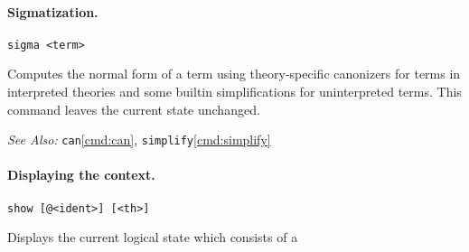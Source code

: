 \documentclass[12pt]{article}
\begin{document}
\paragraph{Sigmatization.}\label{cmd:sigma}
  \begin{center}
  \texttt{sigma <term>}
  \end{center}
Computes the normal form of a term using theory-specific canonizers for 
terms in interpreted theories and some  builtin simplifications 
for uninterpreted terms. This command leaves the current state unchanged.

\noindent
{\em See Also:}  
\texttt{can}\ref{cmd:can},
\texttt{simplify}\ref{cmd:simplify}


\paragraph{Displaying the context.}\label{cmd:show}
  \begin{center}
  \texttt{show [@<ident>] [<th>]}
  \end{center}
Displays the current logical state which consists of a
\end{document}
